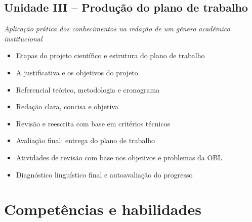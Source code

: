 \documentclass[
]{book}
\providecommand{\tightlist}{%
  \setlength{\itemsep}{0pt}\setlength{\parskip}{0pt}}
\begin{document}
\subsection{Unidade III -- Produção do plano de trabalho}\label{unidade-iii-produuxe7uxe3o-do-plano-de-trabalho}

\emph{Aplicação prática dos conhecimentos na redação de um gênero acadêmico institucional}

\begin{itemize}
\tightlist
\item
  Etapas do projeto científico e estrutura do plano de trabalho\\
\item
  A justificativa e os objetivos do projeto\\
\item
  Referencial teórico, metodologia e cronograma\\
\item
  Redação clara, concisa e objetiva\\
\item
  Revisão e reescrita com base em critérios técnicos\\
\item
  Avaliação final: entrega do plano de trabalho\\
\item
  Atividades de revisão com base nos objetivos e problemas da OBL\\
\item
  Diagnóstico linguístico final e autoavaliação do progresso
\end{itemize}

\section{Competências e habilidades}\label{competuxeancias-e-habilidades}
\end{document}
